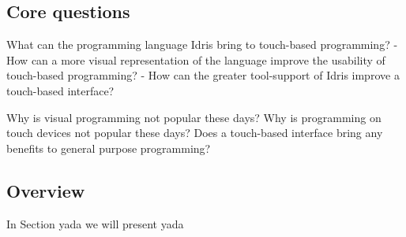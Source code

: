\subsection{Core questions}
\label{subsec:CoreQuestions}


What can the programming language Idris bring to touch-based programming?
  - How can a more visual representation of the language improve the usability of touch-based programming?
  - How can the greater tool-support of Idris improve a touch-based interface?

Why is visual programming not popular these days?
Why is programming on touch devices not popular these days?
Does a touch-based interface bring any benefits to general purpose programming?



\subsection{Overview}
In Section yada we will present yada




